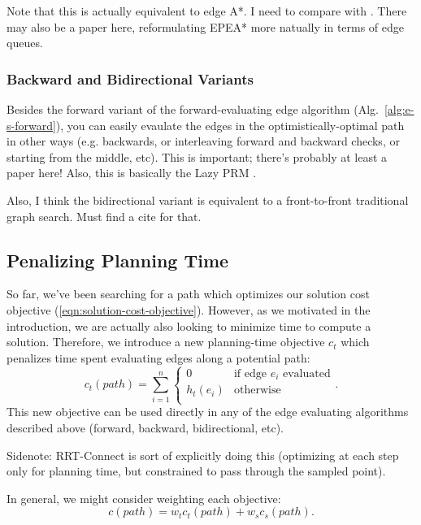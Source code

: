 \documentclass{article}
\begin{document}
Note that this is actually equivalent to edge A*.
I need to compare with \cite{goldenberg2013epeastar}.
There may also be a paper here, reformulating EPEA* more natually
in terms of edge queues.

\subsubsection{Backward and Bidirectional Variants}

Besides the forward variant of the forward-evaluating edge algorithm
(Alg.~\ref{alg:e-s-forward}),
you can easily evaulate the edges in the optimistically-optimal path
in other ways
(e.g. backwards,
or interleaving forward and backward checks,
or starting from the middle, etc).
This is important; there's probably at least a paper here!
Also, this is basically the Lazy PRM \cite{bohlin2000lazyprm}.

Also, I think the bidirectional variant is equivalent to a front-to-front
traditional graph search.
Must find a cite for that.

\subsection{Penalizing Planning Time}

So far, we've been searching for a path which optimizes our solution
cost objective (\ref{eqn:solution-cost-objective}).
However, as we motivated in the introduction,
we are actually also looking to minimize time to compute a solution.
Therefore, we introduce a new planning-time objective $c_t$
which penalizes time spent evaluating edges along a potential path:
\begin{equation}
   c_t(path) = \sum_{i=1}^n \left\{
   \begin{array}{cl}
      0 & \mbox{if edge } e_i \mbox{ evaluated}  \\
      h_t(e_i) & \mbox{otherwise} \\
   \end{array}
   \right.
   .
\end{equation}
This new objective can be used directly in any of the edge evaluating
algorithms described above (forward, backward, bidirectional, etc).

Sidenote: RRT-Connect is sort of explicitly doing this
(optimizing at each step only for planning time,
but constrained to pass through the sampled point).

In general, we might consider weighting each objective:
\begin{equation}
   c(path) = w_t c_t(path) + w_s c_s(path) .
   \label{eqn:general-objective}
\end{equation}
\end{document}
